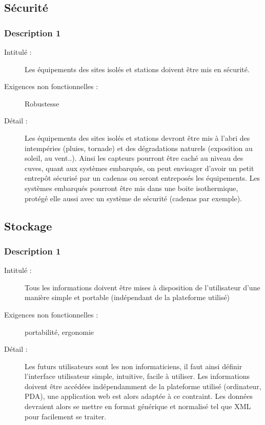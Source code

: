 \subsection {Sécurité}
 \subsubsection {Description 1}
\begin{description}
           \item[Intitulé :] Les équipements des sites isolés et stations doivent être mis en sécurité.
           \item[Exigences non fonctionnelles :] Robustesse
           \item[Détail :] Les équipements des sites isolés et stations devront être mis à l'abri des intempéries (pluies, tornade) 
et des dégradations naturels (exposition au soleil, au vent..). Ainsi les capteurs pourront être caché au niveau 
des cuves, quant aux systèmes embarqués, on peut envisager d'avoir un petit entrepôt sécurisé par un cadenas ou 
seront entreposés les équipements. Les systèmes embarqués pourront être mis dans une boite isothermique, 
protégé elle aussi avec un système de sécurité (cadenas par exemple).
\end{description}

\subsection {Stockage}
 \subsubsection {Description 1}
\begin{description}
           \item[Intitulé :] Tous les informations doivent être mises à disposition de l'utilisateur d'une manière simple et portable (indépendant de la plateforme utilisé)
           \item[Exigences non fonctionnelles :] portabilité,  ergonomie
           \item[Détail :] Les futurs utilisateurs sont les non informaticiens, il faut ainsi définir l’interface utilisateur simple, intuitive, facile à utiliser. Les informations doivent être accédées indépendamment de la plateforme utilisé (ordinateur, PDA), une application web est alors adaptée à ce contraint.  Les données devraient alors se mettre en format générique et normalisé tel que XML pour facilement se traiter.
\end{description}

